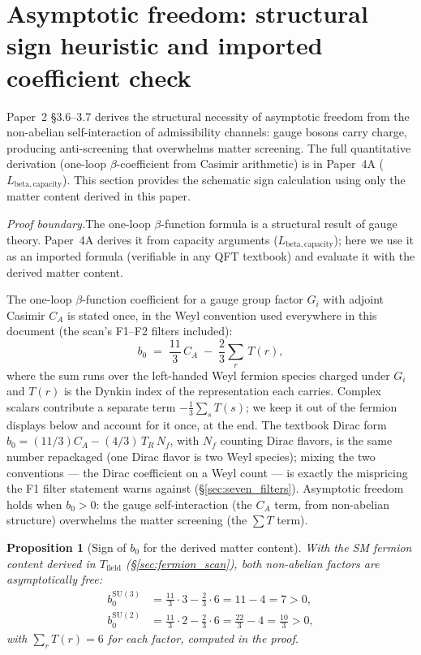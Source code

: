 \documentclass[11pt]{article}
\newtheorem{proposition}[theorem]{Proposition}
\theoremstyle{definition}
\newcommand{\SU}{\mathrm{SU}}
\begin{document}
\section{Asymptotic freedom: structural sign heuristic and imported coefficient check}
\label{sec:beta_schematic}

Paper~2 \S3.6--3.7 derives the structural necessity of asymptotic freedom
from the non-abelian self-interaction of admissibility channels: gauge
bosons carry charge, producing anti-screening that overwhelms matter
screening.  The full quantitative derivation (one-loop $\beta$-coefficient
from Casimir arithmetic) is in Paper~4A ($L_{\mathrm{beta,capacity}}$).
This section provides the schematic sign calculation using only the
matter content derived in this paper.

\textit{Proof boundary.}\quad The one-loop $\beta$-function formula
is a structural result of gauge theory.  Paper~4A derives it from
capacity arguments ($L_{\mathrm{beta,capacity}}$); here we use it as
an imported formula (verifiable in any QFT textbook) and evaluate it
with the derived matter content.

The one-loop $\beta$-function coefficient for a gauge group factor
$G_i$ with adjoint Casimir $C_A$ is stated once, in the Weyl
convention used everywhere in this document (the scan's F1--F2
filters included):
\begin{equation}
  b_0 \;=\; \frac{11}{3}\,C_A \;-\; \frac{2}{3}\sum_{r}\,T(r),
  \label{eq:beta_one_loop}
\end{equation}
where the sum runs over the left-handed Weyl fermion species charged
under $G_i$ and $T(r)$ is the Dynkin index of the representation each
carries.  Complex scalars contribute a separate term
$-\tfrac{1}{3}\sum_{s} T(s)$; we keep it out of the fermion displays
below and account for it once, at the end.  The textbook Dirac form
$b_0 = (11/3)C_A - (4/3)\,T_R\,N_f$, with $N_f$ counting Dirac
flavors, is the same number repackaged (one Dirac flavor is two Weyl
species); mixing the two conventions --- the Dirac coefficient on a
Weyl count --- is exactly the mispricing the F1 filter statement
warns against (\S\ref{sec:seven_filters}).
Asymptotic freedom holds when $b_0 > 0$: the gauge self-interaction
(the $C_A$ term, from non-abelian structure) overwhelms the matter
screening (the $\sum T$ term).

\begin{proposition}[Sign of $b_0$ for the derived matter content]
\label{prop:AF_sign}
With the SM fermion content derived in $T_{\mathrm{field}}$
(\S\ref{sec:fermion_scan}), both non-abelian factors are asymptotically
free:
\begin{align}
  b_0^{\SU(3)} &= \frac{11}{3} \cdot 3 - \frac{2}{3} \cdot 6
    = 11 - 4 = 7 > 0, \label{eq:b0_su3} \\
  b_0^{\SU(2)} &= \frac{11}{3} \cdot 2 - \frac{2}{3} \cdot 6
    = \frac{22}{3} - 4 = \frac{10}{3} > 0, \label{eq:b0_su2}
\end{align}
with $\sum_r T(r) = 6$ for each factor, computed in the proof.
\end{proposition}
\end{document}
